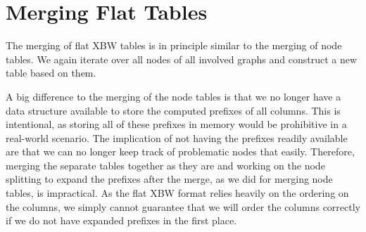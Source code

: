 \documentclass[a4paper,12pt,twoside,BCOR=10mm]{scrbook}
\begin{document}
\section{Merging Flat Tables}
\label{sec:merging_flat_tables}
%

The merging of flat XBW tables is in principle similar to the merging of node tables. 
We again iterate over all nodes of all involved graphs and construct a new table 
based on them. 

A big difference to the merging of the node tables is that we no longer have 
a data structure available to store the computed prefixes of all columns. 
This is intentional, as storing all of these prefixes in memory would be prohibitive 
in a real-world scenario. The implication of not having the prefixes readily available 
are that we can no longer keep track of problematic nodes that easily. 
Therefore, merging the separate tables together as they are and working on the node splitting to expand the prefixes 
after the merge, as we did for merging node tables, is impractical. 
As the flat XBW format relies heavily on the ordering on the columns, 
we simply cannot guarantee that we will order the columns correctly 
if we do not have expanded prefixes in the first place.
\end{document}
